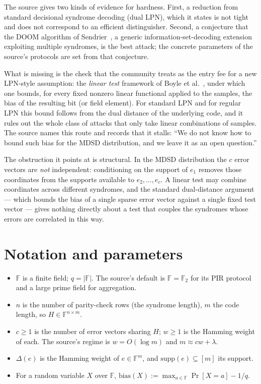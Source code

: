 \documentclass{aicr-conjecture}
\newcommand{\F}{\mathbb{F}}
\newcommand{\bias}{\mathrm{bias}}
\newcommand{\supp}{\mathrm{supp}}
\begin{document}
The source gives two kinds of evidence for hardness. First, a reduction
from standard decisional syndrome decoding (dual LPN), which it states
is not tight and does not correspond to an efficient distinguisher.
Second, a conjecture that the DOOM algorithm of Sendrier~\cite{Sen11},
a generic information-set-decoding extension exploiting multiple
syndromes, is the best attack; the concrete parameters of the source's
protocols are set from that conjecture.

What is missing is the check that the community treats as the entry fee
for a new LPN-style assumption: the \emph{linear test} framework of
Boyle et al.~\cite{BCG+20}, under which one bounds, for every fixed
nonzero linear functional applied to the samples, the bias of the
resulting bit (or field element). For standard LPN and for regular LPN
this bound follows from the dual distance of the underlying code, and it
rules out the whole class of attacks that only take linear combinations
of samples. The source names this route and records that it stalls:
``We do not know how to bound such bias for the MDSD distribution, and
we leave it as an open question.''

The obstruction it points at is structural. In the MDSD distribution the
$c$ error vectors are \emph{not} independent: conditioning on the
support of $e_{1}$ removes those coordinates from the supports available
to $e_{2}, \dots, e_{c}$. A linear test may combine coordinates across
different syndromes, and the standard dual-distance argument --- which
bounds the bias of a single sparse error vector against a single fixed
test vector --- gives nothing directly about a test that couples the
syndromes whose errors are correlated in this way.

\section{Notation and parameters}\label{sec:notation}

\begin{itemize}[nosep]
  \item $\F$ is a finite field; $q = |\F|$. The source's default is
    $\F = \F_{2}$ for its PIR protocol and a large prime field for
    aggregation.
  \item $n$ is the number of parity-check rows (the syndrome length),
    $m$ the code length, so $H \in \F^{n \times m}$.
  \item $c \ge 1$ is the number of error vectors sharing $H$; $w \ge 1$
    is the Hamming weight of each. The source's regime is
    $w = O(\log m)$ and $m \approx cw + \lambda$.
  \item $\Delta(e)$ is the Hamming weight of $e \in \F^{m}$, and
    $\supp(e) \subseteq [m]$ its support.
  \item For a random variable $X$ over $\F$, $\bias(X) := \max_{a \in
    \F} \Pr[X = a] - 1/q$.
\end{itemize}
\end{document}
